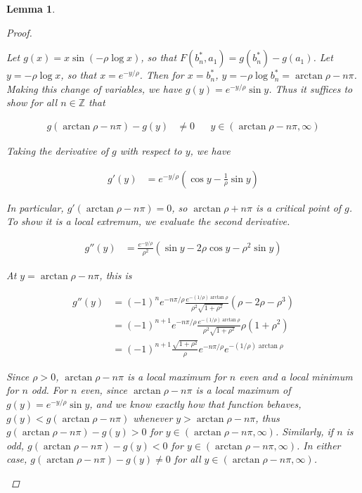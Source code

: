 \documentclass[12pt]{article}
\def\Z{{\mathbb Z}}
\newtheorem{lemma}{Lemma}
\begin{document}
\begin{lemma}
\begin{proof}
\begin{enumerate}
Let $g(x) = x \sin(-\rho \log x)$, so that $F(b^*_n, a_1) = g(b^*_n) - g(a_1)$. Let $y = -\rho \log x$, so that $x = e^{-y/\rho}$. Then for $x = b^*_n$, $y = -\rho \log b^*_n = \arctan \rho - n \pi$. Making this change of variables, we have $g(y) = e^{-y/\rho} \sin y$. Thus it suffices to show for all $n \in \Z$ that

\begin{align*}
g(\arctan \rho - n \pi) - g(y) &\neq 0 && y \in (\arctan \rho - n \pi, \infty) 
\end{align*}

Taking the derivative of $g$ with respect to $y$, we have

\begin{align*}
g'(y) &= e^{-y/\rho}\left( \cos y - \frac{1}{\rho} \sin y \right)
\end{align*}

In particular, $g'(\arctan \rho - n \pi) = 0$, so $\arctan \rho + n \pi$ is a critical point of $g$. To show it is a local extremum, we evaluate the second derivative.

\begin{align*}
g''(y) &= \frac{e^{-y/\rho}}{\rho^2} \left( \sin y - 2 \rho \cos y - \rho^2 \sin y \right)
\end{align*}

At $y = \arctan \rho - n \pi$, this is

\begin{align*}
g''(y) &= (-1)^n e^{-n \pi /\rho} \frac{e^{-(1/\rho)\arctan \rho}}{\rho^2 \sqrt{1+\rho^2}} \left( \rho - 2\rho - \rho^3 \right) \\
&= (-1)^{n+1} e^{-n \pi /\rho} \frac{e^{-(1/\rho)\arctan \rho}}{\rho^2 \sqrt{1+\rho^2}} \rho \left( 1 + \rho^2 \right) \\
&= (-1)^{n+1} \frac{ \sqrt{1 + \rho^2}}{\rho} e^{-n \pi /\rho} e^{-(1/\rho)\arctan \rho}
\end{align*}

Since $\rho > 0$, $\arctan \rho - n \pi$ is a local maximum for $n$ even and a local minimum for $n$ odd. For $n$ even, since $\arctan \rho - n \pi$ is a local maximum of $g(y) = e^{-y/\rho} \sin y$, and we know exactly how that function behaves, $g(y) < g(\arctan \rho - n \pi)$ whenever $y > \arctan \rho - n \pi$, thus $g(\arctan \rho - n \pi) - g(y) > 0$ for $y \in (\arctan \rho - n \pi, \infty)$. Similarly, if $n$ is odd, $g(\arctan \rho - n \pi) - g(y) < 0$ for $y \in (\arctan \rho - n \pi, \infty)$. In either case, $g(\arctan \rho - n \pi) - g(y) \neq 0$ for all $y \in (\arctan \rho - n \pi, \infty)$.


\end{enumerate}
\end{proof}
\end{lemma}
\end{document}
